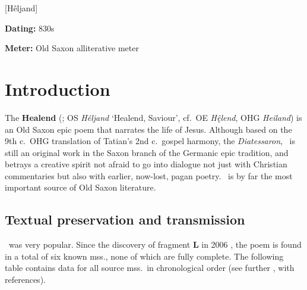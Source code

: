 [Hêljand]%

\begin{flushright}%
\textbf{Dating:} 830s \ce

\textbf{Meter:} Old Saxon alliterative meter
\end{flushright}%

\section{Introduction}

The \textbf{Healend} (; OS \emph{Hêljand} ‘Healend, Saviour’, cf.~OE \emph{Hę̂lend}, OHG \emph{Heiland}) is an Old Saxon epic poem that narrates the life of Jesus.  Although based on the 9th c.~OHG translation of Tatian’s 2nd c.~gospel harmony, the \emph{Diatessaron}, \Heliand\ is still an original work in the Saxon branch of the Germanic epic tradition, and betrays a creative spirit not afraid to go into dialogue not just with Christian commentaries but also with earlier, now-lost, pagan poetry.  \Heliand\ is by far the most important source of Old Saxon literature.

\subsection{Textual preservation and transmission}

\Heliand\ was very popular.  Since the discovery of fragment \textbf{L} in 2006 \parencite[9--10]{Price2010}, the poem is found in a total of six known mss., none of which are fully complete.  The following table contains data for all source mss.~in chronological order (see further \cite[11--12]{Price2010}, with references).

